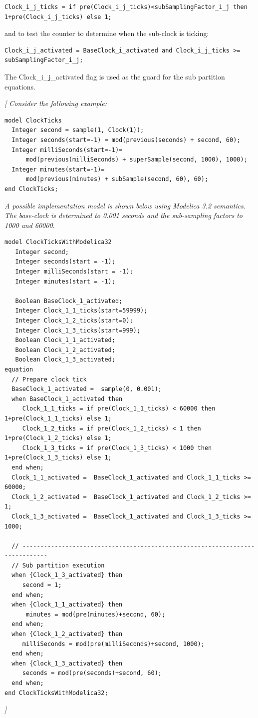 \documentclass[10pt,a4paper]{report}
\begin{document}
\begin{lstlisting}[language=modelica]
Clock_i_j_ticks = if pre(Clock_i_j_ticks)<subSamplingFactor_i_j then 1+pre(Clock_i_j_ticks) else 1;
\end{lstlisting}

and to test the counter to determine when the sub-clock is ticking:
\begin{lstlisting}[language=modelica]
Clock_i_j_activated = BaseClock_i_activated and Clock_i_j_ticks >= subSamplingFactor_i_j;
\end{lstlisting}
The Clock\_i\_j\_activated flag is used as the guard for the sub
partition equations.

\emph{{[} Consider the following example:}

\begin{lstlisting}[language=modelica]
model ClockTicks
  Integer second = sample(1, Clock(1));
  Integer seconds(start=-1) = mod(previous(seconds) + second, 60);
  Integer milliSeconds(start=-1)=
      mod(previous(milliSeconds) + superSample(second, 1000), 1000);
  Integer minutes(start=-1)=
      mod(previous(minutes) + subSample(second, 60), 60);
end ClockTicks;
\end{lstlisting}

\emph{A possible implementation model is shown below using Modelica 3.2
semantics. The base-clock is determined to 0.001 seconds and the
sub-sampling factors to 1000 and 60000.}

\begin{lstlisting}[language=modelica]
model ClockTicksWithModelica32
   Integer second;
   Integer seconds(start = -1);
   Integer milliSeconds(start = -1);
   Integer minutes(start = -1);  

   Boolean BaseClock_1_activated;
   Integer Clock_1_1_ticks(start=59999);
   Integer Clock_1_2_ticks(start=0);
   Integer Clock_1_3_ticks(start=999);
   Boolean Clock_1_1_activated;
   Boolean Clock_1_2_activated;
   Boolean Clock_1_3_activated; 
equation  
  // Prepare clock tick   
  BaseClock_1_activated =  sample(0, 0.001);
  when BaseClock_1_activated then
     Clock_1_1_ticks = if pre(Clock_1_1_ticks) < 60000 then 1+pre(Clock_1_1_ticks) else 1;
     Clock_1_2_ticks = if pre(Clock_1_2_ticks) < 1 then 1+pre(Clock_1_2_ticks) else 1;
     Clock_1_3_ticks = if pre(Clock_1_3_ticks) < 1000 then 1+pre(Clock_1_3_ticks) else 1;
  end when;
  Clock_1_1_activated =  BaseClock_1_activated and Clock_1_1_ticks >= 60000;
  Clock_1_2_activated =  BaseClock_1_activated and Clock_1_2_ticks >= 1;
  Clock_1_3_activated =  BaseClock_1_activated and Clock_1_3_ticks >= 1000; 
 
  // ----------------------------------------------------------------------------- 
  // Sub partition execution   
  when {Clock_1_3_activated} then     
     second = 1;
  end when;
  when {Clock_1_1_activated} then
      minutes = mod(pre(minutes)+second, 60);
  end when;
  when {Clock_1_2_activated} then
     milliSeconds = mod(pre(milliSeconds)+second, 1000);
  end when;
  when {Clock_1_3_activated} then
     seconds = mod(pre(seconds)+second, 60);
  end when;
end ClockTicksWithModelica32;
\end{lstlisting}
\emph{{]}}
\end{document}
